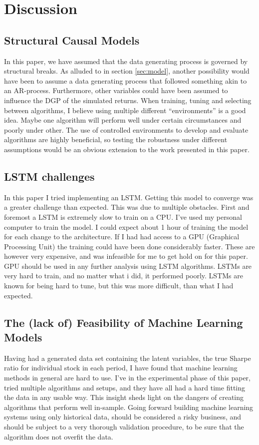 \section{Discussion}

\subsection{Structural Causal Models}

In this paper, we have assumed that the data generating process is governed by structural breaks. As alluded to in section \ref{sec:model}, another possibility would have been to assume a data generating process that followed something akin to an AR-process. Furthermore, other variables could have been assumed to influence the DGP of the simulated returns. When training, tuning and selecting between algorithms, I believe using multiple different ``environments'' is a good idea. Maybe one algorithm will perform well under certain circumstances and poorly under other. The use of controlled environments to develop and evaluate algorithms are highly beneficial, so testing the robustness under different assumptions would be an obvious extension to the work presented in this paper.

\subsection{LSTM challenges}

In this paper I tried implementing an LSTM. Getting this model to converge was a greater challenge than expected. This was due to multiple obstacles. First and foremost a LSTM is extremely slow to train on a CPU. I've used my personal computer to train the model. I could expect about 1 hour of training the model for each change to the architecture. If I had had access to a GPU (Graphical Processing Unit) the training could have been done considerably faster. These are however very expensive, and was infeasible for me to get hold on for this paper. GPU should be used in any further analysis using LSTM algorithms. LSTMs are very hard to train, and no matter what i did, it performed poorly. LSTMs are known for being hard to tune, but this was more difficult, than what I had expected.

\subsection{The (lack of) Feasibility of Machine Learning Models}

Having had a generated data set containing the latent variables, the true Sharpe ratio for individual stock  in each period, I have found that machine learning methods in general are hard to use. I've in the experimental phase of this paper, tried multiple algorithms and setups, and they have all had a hard time fitting the data in any usable way. This insight sheds light on the dangers of creating algorithms that perform well in-sample. Going forward building machine learning systems using only historical data, should be considered a risky business, and should be subject to a very thorough validation procedure, to be sure that the algorithm does not overfit the data.

